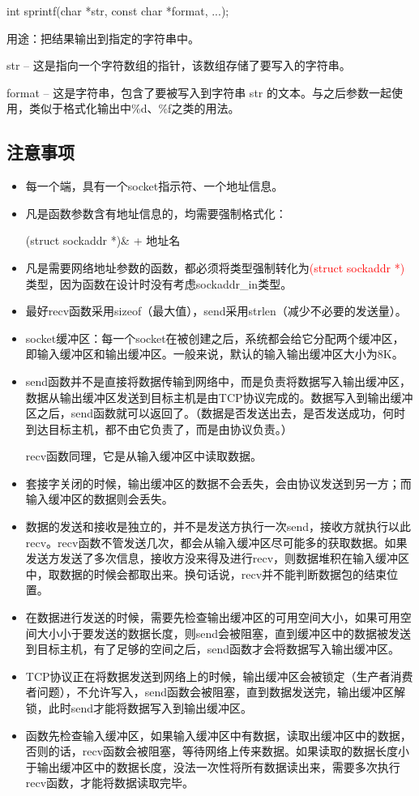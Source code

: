\documentclass[UTF8]{article}%
\begin{document}
int sprintf(char *str, const char *format, ...);

用途：把结果输出到指定的字符串中。

str -- 这是指向一个字符数组的指针，该数组存储了要写入的字符串。

format -- 这是字符串，包含了要被写入到字符串 str 的文本。与之后参数一起使用，类似于格式化输出中\%d、\%f之类的用法。



\subsection{注意事项}

\begin{itemize}
    \item 每一个端，具有一个socket指示符、一个地址信息。
    \item 凡是函数参数含有地址信息的，均需要强制格式化：
    
    (struct sockaddr *)\& + 地址名

    \item 凡是需要网络地址参数的函数，都必须将类型强制转化为\textcolor{red}{(struct sockaddr *)}类型，因为函数在设计时没有考虑sockaddr\_in类型。
    \item 最好recv函数采用sizeof（最大值），send采用strlen（减少不必要的发送量）。
    \item socket缓冲区：每一个socket在被创建之后，系统都会给它分配两个缓冲区，即输入缓冲区和输出缓冲区。一般来说，默认的输入输出缓冲区大小为8K。
    \item send函数并不是直接将数据传输到网络中，而是负责将数据写入输出缓冲区，数据从输出缓冲区发送到目标主机是由TCP协议完成的。数据写入到输出缓冲区之后，send函数就可以返回了。（数据是否发送出去，是否发送成功，何时到达目标主机，都不由它负责了，而是由协议负责。）
    
    recv函数同理，它是从输入缓冲区中读取数据。

    \item 套接字关闭的时候，输出缓冲区的数据不会丢失，会由协议发送到另一方；而输入缓冲区的数据则会丢失。
    \item 数据的发送和接收是独立的，并不是发送方执行一次send，接收方就执行以此recv。recv函数不管发送几次，都会从输入缓冲区尽可能多的获取数据。如果发送方发送了多次信息，接收方没来得及进行recv，则数据堆积在输入缓冲区中，取数据的时候会都取出来。换句话说，recv并不能判断数据包的结束位置。
    \item 在数据进行发送的时候，需要先检查输出缓冲区的可用空间大小，如果可用空间大小小于要发送的数据长度，则send会被阻塞，直到缓冲区中的数据被发送到目标主机，有了足够的空间之后，send函数才会将数据写入输出缓冲区。
    \item TCP协议正在将数据发送到网络上的时候，输出缓冲区会被锁定（生产者消费者问题），不允许写入，send函数会被阻塞，直到数据发送完，输出缓冲区解锁，此时send才能将数据写入到输出缓冲区。
    \item 函数先检查输入缓冲区，如果输入缓冲区中有数据，读取出缓冲区中的数据，否则的话，recv函数会被阻塞，等待网络上传来数据。如果读取的数据长度小于输出缓冲区中的数据长度，没法一次性将所有数据读出来，需要多次执行recv函数，才能将数据读取完毕。
\end{itemize}
\end{document}
